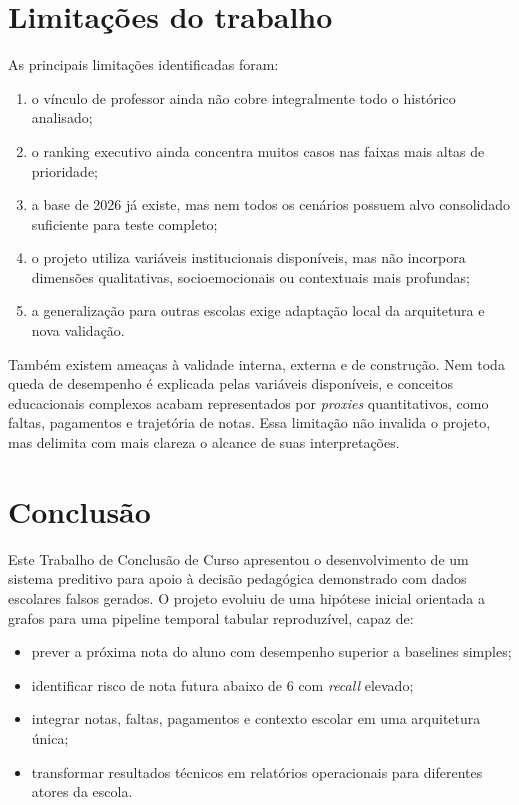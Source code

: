 \section{Limita\c{c}\~oes do trabalho}
\label{sec:limitacoes}

As principais limita\c{c}\~oes identificadas foram:
\begin{enumerate}
    \item o v\'inculo de professor ainda n\~ao cobre integralmente todo o hist\'orico analisado;
    \item o ranking executivo ainda concentra muitos casos nas faixas mais altas de prioridade;
    \item a base de 2026 j\'a existe, mas nem todos os cen\'arios possuem alvo consolidado suficiente para teste completo;
    \item o projeto utiliza vari\'aveis institucionais dispon\'iveis, mas n\~ao incorpora dimens\~oes qualitativas, socioemocionais ou contextuais mais profundas;
    \item a generaliza\c{c}\~ao para outras escolas exige adapta\c{c}\~ao local da arquitetura e nova valida\c{c}\~ao.
\end{enumerate}

Tamb\'em existem amea\c{c}as \`a validade interna, externa e de constru\c{c}\~ao. Nem toda queda de desempenho \'e explicada pelas vari\'aveis dispon\'iveis, e conceitos educacionais complexos acabam representados por \textit{proxies} quantitativos, como faltas, pagamentos e trajet\'oria de notas. Essa limita\c{c}\~ao n\~ao invalida o projeto, mas delimita com mais clareza o alcance de suas interpreta\c{c}\~oes.

\section{Conclus\~ao}
\label{sec:conclusao-final}

Este Trabalho de Conclus\~ao de Curso apresentou o desenvolvimento de um sistema preditivo para apoio \`a decis\~ao pedag\'ogica demonstrado com dados escolares falsos gerados. O projeto evoluiu de uma hip\'otese inicial orientada a grafos para uma pipeline temporal tabular reproduz\'ivel, capaz de:
\begin{itemize}
    \item prever a pr\'oxima nota do aluno com desempenho superior a baselines simples;
    \item identificar risco de nota futura abaixo de 6 com \textit{recall} elevado;
    \item integrar notas, faltas, pagamentos e contexto escolar em uma arquitetura \'unica;
    \item transformar resultados t\'ecnicos em relat\'orios operacionais para diferentes atores da escola.
\end{itemize}

